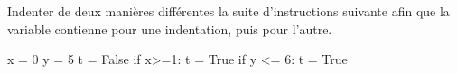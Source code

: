\question Indenter de deux manières différentes la suite d'instructions suivante afin que la variable  contienne  pour une indentation, puis  pour l'autre. 
\begin{pyverbatim}
x = 0
y = 5
t = False
if x>=1:
t = True
if y <= 6:
t = True
\end{pyverbatim}